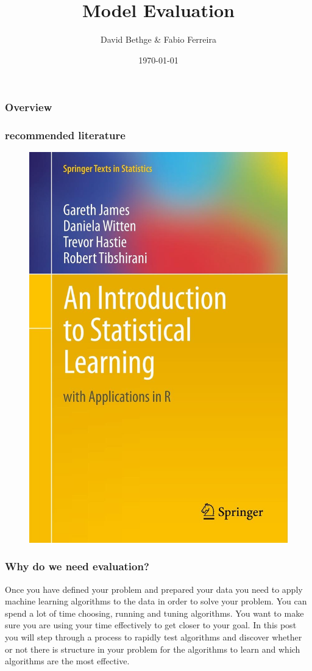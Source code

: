\documentclass{beamer}
\title[Model Evaluation]{Model Evaluation} %
\author{David Bethge \& Fabio Ferreira} %
\institute[] %
{
DHBW Karlsruhe \\ %
\medskip
\textit{} %
}
\date{\today} %
\begin{document}
\begin{frame}
\titlepage %
\end{frame}

\begin{frame}
\frametitle{Overview} %
\tableofcontents %
\end{frame}



\begin{frame}
\frametitle{recommended literature}
\begin{figure}
\includegraphics[width =.4\linewidth]{figures/03/Literature2.jpg}
\end{figure}

\end{frame}


\begin{frame}
\frametitle{Why do we need evaluation?}
Once you have defined your problem and prepared your data you need to apply machine learning algorithms to the data in order to solve your problem. You can spend a lot of time choosing, running and tuning algorithms. You want to make sure you are using your time effectively to get closer to your goal.
\newline
\newline
In this post you will step through a process to rapidly test algorithms and discover whether or not there is structure in your problem for the algorithms to learn and which algorithms are the most effective.
\end{frame}
\end{document}
